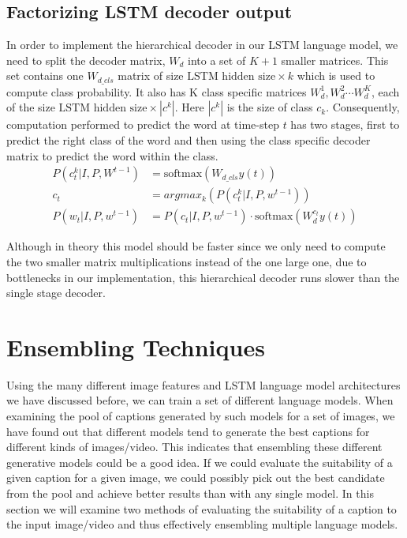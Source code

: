 \subsection{Factorizing LSTM decoder output}
In order to implement the hierarchical decoder in our LSTM language model, we
need to split the decoder matrix, $W_d$ into a set of $K+1$ smaller matrices.
This set contains one $W_{d\_cls}$ matrix of size $\text{LSTM hidden size}
\times k$ which is used to compute class probability.
It also has K class specific matrices ${W_{d}^{1},W_{d}^{2}\cdots W_{d}^{K}}$,
each of the size $\text{LSTM hidden size}\times |c^k|$.
Here $|c^k|$ is the size of class $c_k$.
Consequently, computation performed to predict the word at time-step $t$ has two
stages, first to predict the right class of the word and then using the class
specific decoder matrix to predict the word within the class.
\begin{align}
        \label{eq:classLStmdecoder}
        P(c_{t}^{k}| I,P, W^{t-1}) &= \text{softmax}(W_{d\_cls} y(t)) \\
        c_t &= argmax_k\left(P(c_{t}^k| I,P, w^{t-1})\right) \\
        P(w_t | I,P, w^{t-1}) &= P(c_t| I,P, w^{t-1}) \cdot \text{softmax}(W_{d}^{c_t} y(t))
\end{align}

Although in theory this model should be faster since we only need to compute the
two smaller matrix multiplications instead of the one large one, due to
bottlenecks in our implementation, this hierarchical decoder runs slower than
the single stage decoder.
\section{Ensembling Techniques}
Using the many different image features and LSTM language model architectures we
have discussed before, we can train a set of different language models.
When examining the pool of captions generated by such models for a set of
images, we have found out that different models tend to generate the best
captions for different kinds of images/video.
This indicates that ensembling these different generative models could be a good
idea.
If we could evaluate the suitability of a given caption for a
given image, we could possibly pick out the best candidate from the pool and
achieve better results than with any single model.
In this section we will examine two methods of evaluating the suitability
of a caption to the input image/video and thus effectively ensembling multiple
language models.

